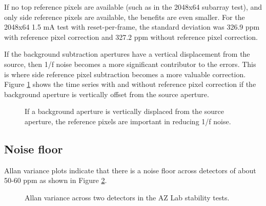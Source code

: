 \documentclass{aastex62}
\begin{document}
{If no top reference pixels are available (such as in the 2048x64 subarray test), and only side reference pixels are available, the benefits are even smaller.
For the 2048x64 1.5 mA test with reset-per-frame, the standard deviation was 326.9 ppm with reference pixel correction and 327.2 ppm without reference pixel correction.

If the background subtraction apertures have a vertical displacement from the source, then 1/f noise becomes a more significant contributor to the errors.
This is where side reference pixel subtraction becomes a more valuable correction.
Figure \ref{fig:RefpixWithVertOffsetBackground} shows the time series with and without reference pixel correction if the background aperture is vertically offset from the source aperture.

\begin{figure}
{}
{}
\caption{If a background aperture is vertically displaced from the source aperture, the reference pixels are important in reducing 1/f noise.}\label{fig:RefpixWithVertOffsetBackground}
\end{figure}

\clearpage
\subsection{Noise floor}

Allan variance plots indicate that there is a noise floor across detectors of about 50-60 ppm as shown in Figure \ref{fig:allanVarianceAZ04AZ05}.

\begin{figure}
{}
\caption{Allan variance across two detectors in the AZ Lab stability tests.}\label{fig:allanVarianceAZ04AZ05}
\end{figure}


}
\end{document}
